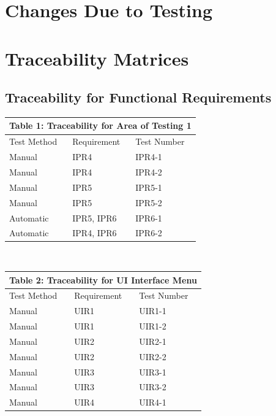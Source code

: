 \documentclass[12pt, titlepage]{article}
\begin{document}
\section{Changes Due to Testing}
	
\section{Traceability Matrices}
\subsection{Traceability for Functional Requirements}
\begin{tabular}{|p{}|p{}|p{}|}

\hline \multicolumn{3}{|c|}{Table 1: Traceability for Area of Testing 1}\\

\hline Test Method&Requirement&Test Number\\

\hline Manual&IPR4&IPR4-1\\

\hline Manual&IPR4&IPR4-2\\

\hline Manual&IPR5&IPR5-1\\

\hline Manual&IPR5&IPR5-2\\

\hline Automatic&IPR5, IPR6&IPR6-1\\

\hline Automatic&IPR4, IPR6&IPR6-2\\

\hline

\end{tabular}
\\
\begin{tabular}{|p{}|p{}|p{}|}

\hline \multicolumn{3}{|c|}{Table 2: Traceability for UI Interface Menu}\\

\hline Test Method&Requirement&Test Number\\

\hline Manual&UIR1&UIR1-1\\

\hline Manual&UIR1&UIR1-2\\

\hline Manual&UIR2&UIR2-1\\

\hline Manual&UIR2&UIR2-2\\

\hline Manual&UIR3&UIR3-1\\

\hline Manual&UIR3&UIR3-2\\

\hline Manual&UIR4&UIR4-1\\

\hline

\end{tabular}
\end{document}
